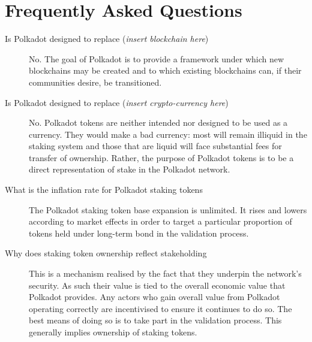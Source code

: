 \section{Frequently Asked Questions}

\begin{description}

\item[Is Polkadot designed to replace (\textit{insert blockchain here})] No. The goal of Polkadot is to provide a framework under which new blockchains may be created and to which existing blockchains can, if their communities desire, be transitioned.

\item[Is Polkadot designed to replace (\textit{insert crypto-currency here})] No. Polkadot tokens are neither intended nor designed to be used as a currency. They would make a bad currency: most will remain illiquid in the staking system and those that are liquid will face substantial fees for transfer of ownership. Rather, the purpose of Polkadot tokens is to be a direct representation of stake in the Polkadot network.

\item[What is the inflation rate for Polkadot staking tokens] The Polkadot staking token base expansion is unlimited. It rises and lowers according to market effects in order to target a particular proportion of tokens held under long-term bond in the validation process.

\item[Why does staking token ownership reflect stakeholding] This is a mechanism realised by the fact that they underpin the network's security. As such their value is tied to the overall economic value that Polkadot provides. Any actors who gain overall value from Polkadot operating correctly are incentivised to ensure it continues to do so. The best means of doing so is to take part in the validation process. This generally implies ownership of staking tokens.

\end{description}
